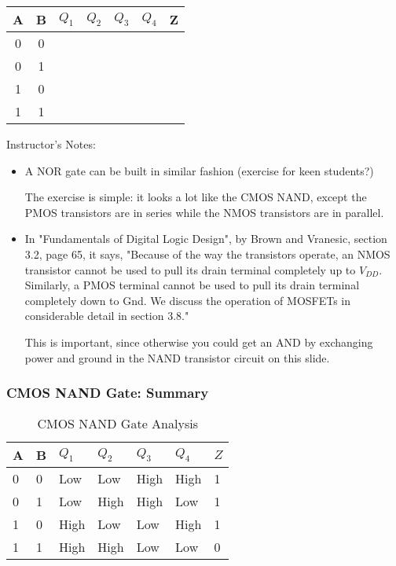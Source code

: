 \begin{frame}[fragile]
\bigskip

\begin{center}
\begin{tabular}{cc|cccc|c}
A	& B	& $Q_1$	& $Q_2$	& $Q_3$	& $Q_4$	& Z\\\hline
0	& 0	& 	& 	& 	& 	& \\
0	& 1	& 	&	&	&	&\\
1	& 0	& 	&	&	&	&\\
1	& 1	& 	&	&	&	&
\end{tabular}
\end{center}
\end{frame}
\BNotes\ifnum{}
\begin{frame}[fragile]
Instructor's Notes:
\begin{itemize}
\item A NOR gate can be built in similar fashion (exercise for keen students?)

	The exercise is simple: it looks a lot like the CMOS NAND, except the
	PMOS transistors are in series while the NMOS transistors are in
	parallel.

\item In "Fundamentals of Digital Logic Design", by Brown
	and Vranesic, section 3.2, page 65, it says, "Because of the way the
	transistors operate, an NMOS transistor cannot be used to pull its
	drain terminal completely up to $V_{DD}$. Similarly, a PMOS terminal
	cannot be used to pull its drain terminal completely down to Gnd. We
	discuss the operation of MOSFETs in considerable detail in section
	3.8."

	This is important, since otherwise you could get an AND by exchanging 
	power and ground in the NAND transistor circuit on this slide.

\end{itemize}
\end{frame}
\fi\ENotes

\begin{frame}\frametitle{CMOS NAND Gate: Summary}

\begin{table}[H]
\begin{center}
    \begin{tabular}{ |p{1cm} |p{1cm} || p{1cm} |p{1cm} |p{1cm} |p{1cm} || p{1cm} |}
    \hline 
A & B & $Q_1$ & $Q_2$ & $Q_3$ & $Q_4$ & $Z$  \\ \hline
0 & 0 & Low  & Low  & High & High & 1  \\ \hline
0 & 1 & Low  & High & High & Low  & 1 \\ \hline
1 & 0 & High & Low  & Low  & High & 1\\ \hline
1 & 1 & High & High & Low  & Low  & 0  \\ \hline
\end{tabular}
\caption{CMOS NAND Gate Analysis}
\end{center}
\end{table}


\end{frame}



